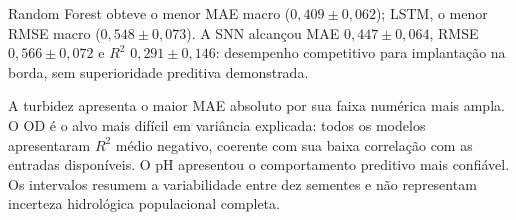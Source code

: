 \PosterBody
Random Forest obteve o menor MAE macro ($0{,}409 \pm 0{,}062$); LSTM, o menor RMSE macro ($0{,}548 \pm 0{,}073$). A SNN alcançou MAE $0{,}447 \pm 0{,}064$, RMSE $0{,}566 \pm 0{,}072$ e $R^2$ $0{,}291 \pm 0{,}146$: desempenho competitivo para implantação na borda, sem superioridade preditiva demonstrada.

A turbidez apresenta o maior MAE absoluto por sua faixa numérica mais ampla. O OD é o alvo mais difícil em variância explicada: todos os modelos apresentaram $R^2$ médio negativo, coerente com sua baixa correlação com as entradas disponíveis. O pH apresentou o comportamento preditivo mais confiável. Os intervalos resumem a variabilidade entre dez sementes e não representam incerteza hidrológica populacional completa.

\begin{center}

\end{center}
